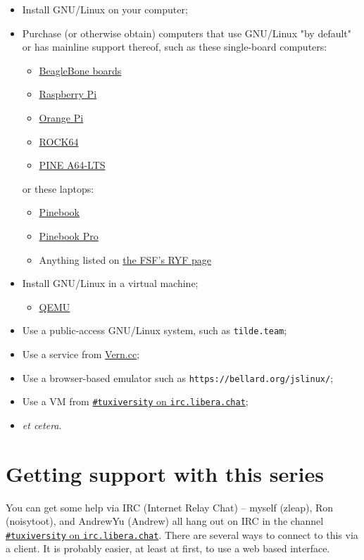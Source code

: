 \documentclass{extbook}
\newcommand\libera[1]{\href{https://web.libera.chat/?channel=\##1}{\texttt{\##1} on \texttt{irc.libera.chat}}}
\begin{document}
\begin{itemize}
\item Install GNU/Linux on your computer;
\item Purchase (or otherwise obtain) computers that use GNU/Linux "by default" or has mainline support thereof, such as these single-board computers:
  \begin{itemize}
  \item \href{https://beagleboard.org}{BeagleBone boards}
  \item \href{https://www.raspberrypi.org/}{Raspberry Pi}
  \item \href{http://www.orangepi.org/}{Orange Pi}
  \item \href{https://www.pine64.org/devices/single-board-computers/rock64/}{ROCK64}
  \item \href{https://www.pine64.org/devices/single-board-computers/pine-a64-lts/}{PINE A64-LTS}
  \end{itemize}
  or these laptops:
  \begin{itemize}
  \item \href{https://www.pine64.org/pinebook/}{Pinebook}
  \item \href{https://www.pine64.org/pinebook-pro/}{Pinebook Pro}
  \item Anything listed on \href{https://ryf.fsf.org/categories/laptops}{the FSF's RYF page}
  \end{itemize}
\item Install GNU/Linux in a virtual machine;
  \begin{itemize}
  \item \href{https://www.qemu.org/}{QEMU}
  \end{itemize}
\item Use a public-access GNU/Linux system, such as \texttt{tilde.team};
\item Use a service from \href{https://www.vern.cc}{Vern.cc};
\item Use a browser-based emulator such as \texttt{https://bellard.org/jslinux/};
\item Use a VM from \libera{tuxiversity};
\item \textit{et cetera}.
\end{itemize}

\chapter{Getting support with this series}

You can get some help via IRC (Internet Relay Chat) -- myself (zleap), Ron (noisytoot), and AndrewYu (Andrew) all hang out on IRC in the channel \libera{tuxiversity}. There are several ways to connect to this via a client. It is probably easier, at least at first, to use a web based interface.
\end{document}
